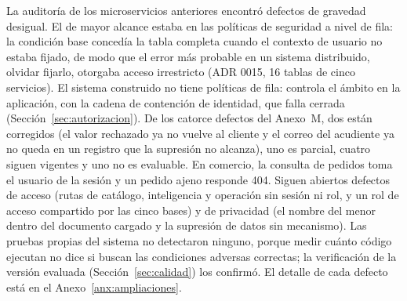 La auditoría de los microservicios anteriores encontró defectos de gravedad desigual. El de mayor
alcance estaba en las políticas de seguridad a nivel de fila: la condición base concedía la tabla
completa cuando el contexto de usuario no estaba fijado, de modo que el error más probable en un
sistema distribuido, olvidar fijarlo, otorgaba acceso irrestricto (ADR 0015, 16 tablas de cinco
servicios). El sistema construido no tiene políticas de fila: controla el ámbito en la aplicación,
con la cadena de contención de identidad, que falla cerrada (Sección~\ref{sec:autorizacion}).
De los catorce defectos del Anexo~M, dos están corregidos (el valor rechazado ya no vuelve al
cliente y el correo del acudiente ya no queda en un registro que la supresión no alcanza), uno es
parcial, cuatro siguen vigentes y uno no es evaluable. En comercio, la consulta de pedidos toma el
usuario de la sesión y un pedido ajeno responde 404. Siguen abiertos defectos de acceso (rutas de
catálogo, inteligencia y operación sin sesión ni rol, y un rol de acceso compartido por las cinco
bases) y de privacidad (el nombre del menor dentro del documento cargado y la supresión de datos
sin mecanismo). Las pruebas propias del sistema no detectaron ninguno, porque medir cuánto código
ejecutan no dice si buscan las condiciones adversas correctas; la verificación de la versión
evaluada (Sección~\ref{sec:calidad}) los confirmó. El detalle de cada defecto está en el
Anexo~\ref{anx:ampliaciones}.

